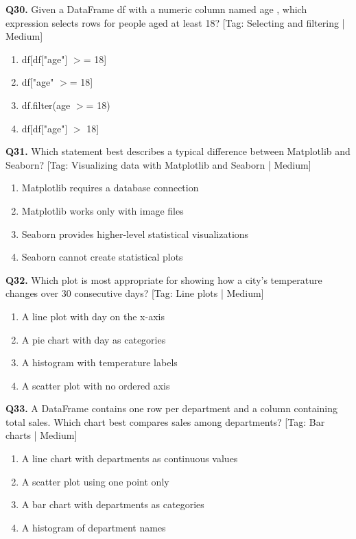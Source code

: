 \vspace{2mm}
\noindent\textbf{Q30.} Given a DataFrame df with a numeric column named age , which expression selects rows for people aged at least 18? \hfill [Tag: Selecting and filtering | Medium]
\begin{enumerate}[label=(\alph*),topsep=2pt,itemsep=1pt,partopsep=0pt,parsep=0pt]
    \item {df[df["age"] $>$= 18]}
    \item {df["age" $>$= 18]}
    \item {df.filter(age $>$= 18)}
    \item {df[df["age"] $>$ 18]}
\end{enumerate}
\vspace{2mm}
\noindent\textbf{Q31.} Which statement best describes a typical difference between Matplotlib and Seaborn? \hfill [Tag: Visualizing data with Matplotlib and Seaborn | Medium]
\begin{enumerate}[label=(\alph*),topsep=2pt,itemsep=1pt,partopsep=0pt,parsep=0pt]
    \item {Matplotlib requires a database connection}
    \item {Matplotlib works only with image files}
    \item {Seaborn provides higher-level statistical visualizations}
    \item {Seaborn cannot create statistical plots}
\end{enumerate}
\vspace{2mm}
\noindent\textbf{Q32.} Which plot is most appropriate for showing how a city's temperature changes over 30 consecutive days? \hfill [Tag: Line plots | Medium]
\begin{enumerate}[label=(\alph*),topsep=2pt,itemsep=1pt,partopsep=0pt,parsep=0pt]
    \item {A line plot with day on the x-axis}
    \item {A pie chart with day as categories}
    \item {A histogram with temperature labels}
    \item {A scatter plot with no ordered axis}
\end{enumerate}
\vspace{2mm}
\noindent\textbf{Q33.} A DataFrame contains one row per department and a column containing total sales. Which chart best compares sales among departments? \hfill [Tag: Bar charts | Medium]
\begin{enumerate}[label=(\alph*),topsep=2pt,itemsep=1pt,partopsep=0pt,parsep=0pt]
    \item {A line chart with departments as continuous values}
    \item {A scatter plot using one point only}
    \item {A bar chart with departments as categories}
    \item {A histogram of department names}
\end{enumerate}
